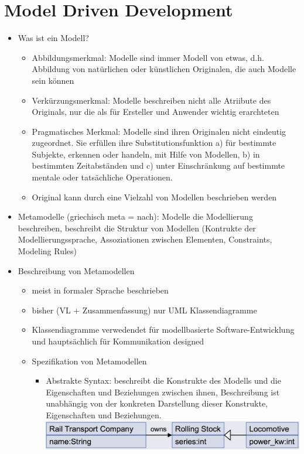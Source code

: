 \documentclass[paper=a4, fontsize=11pt]{scrartcl} %
\numberwithin{equation}{section} %
\numberwithin{figure}{section} %
\numberwithin{table}{section} %
\begin{document}
\section{Model Driven Development}

\begin{itemize}
  \item Was ist ein Modell?
  \begin{itemize}
    \item Abbildungsmerkmal: Modelle sind immer Modell von etwas, d.h. Abbildung von natürlichen oder künstlichen Originalen, die auch Modelle sein können
    \item Verkürzungsmerkmal: Modelle beschreiben nicht alle Atriibute des Originals, nur die als für Ersteller und Anwender wichtig erarchteten
    \item Pragmatisches Merkmal: Modelle sind ihren Originalen nicht eindeutig zugeordnet. Sie erfüllen ihre Substitutionsfunktion a) für bestimmte Subjekte, erkennen oder handeln, mit Hilfe von Modellen, b) in bestimmten Zeitabständen und c) unter Einschränkung auf bestimmte mentale oder tatsächliche Operationen.
    \item Original kann durch eine Vielzahl von Modellen beschrieben werden
  \end{itemize}
  \item Metamodelle (griechisch meta = nach): Modelle die Modellierung beschreiben, beschreibt die Struktur von Modellen (Kontrukte der Modellierungssprache, Assoziationen zwischen Elementen, Constraints, Modeling Rules)
  \item Beschreibung von Metamodellen
  \begin{itemize}
    \item meist in formaler Sprache beschrieben
    \item bisher (VL + Zusammenfassung) nur UML Klassendiagramme
    \item Klassendiagramme verwedendet für modellbasierte Software-Entwicklung und hauptsächlich für Kommunikation designed
    \item Spezifikation von Metamodellen
    \begin{itemize}
      \item Abstrakte Syntax: beschreibt die Konstrukte des Modells und die Eigenschaften und Beziehungen zwischen ihnen, Beschreibung ist unabhängig von der konkreten Darstellung dieser Konstrukte, Eigenschaften und Beziehungen.\\
      \includegraphics[width=\textwidth]{imgs/abssyntax}

\end{itemize}
\end{itemize}
\end{itemize}
\end{document}
